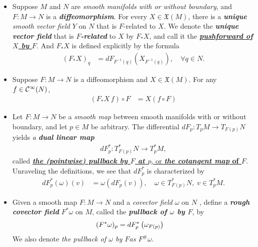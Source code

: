 \documentclass[11pt]{article}
\begin{document}
\begin{itemize}
\item \begin{definition}
Suppose $M$ and $N$ are \emph{smooth manifolds with or without boundary}, and $F: M \rightarrow N$ is a \textbf{\emph{diffeomorphism}}. For every $X \in \mathfrak{X}(M)$, there is a \textbf{\emph{unique}} \emph{smooth vector field} $Y$ on $N$ that is $F$-related to $X$. We denote the \emph{\textbf{unique vector field}} that is \emph{\textbf{$F$-related}} to $X$ by \underline{$F_{*}X$}, and call it the \underline{\emph{\textbf{pushforward of $X$ by $F$}}}. And $F_{*}X$ is defined explicitly by the formula
\begin{align}
(F_{*}X)_{q} &= dF_{F^{-1}(q)}(X_{F^{-1}(q)}),\quad \forall q\in N. \label{eqn: pushforward_of_vector_fields}
\end{align} 
\end{definition} 

\item \begin{corollary}
Suppose $F: M \rightarrow N$ is a diffeomorphism and $X \in \mathfrak{X}(M)$.  For any $f \in {\mathcal C}^{\infty}(N)$, 
\begin{align*}
(F_{*}X\,f) \circ F &= X(f \circ F)
\end{align*}
\end{corollary}

\item \begin{definition}
Let $F: M \rightarrow N$ be a \emph{smooth map} between smooth manifolds with or without boundary, and let $p \in M$ be arbitrary. The differential $dF_p: T_{p}M \rightarrow T_{F(p)}N$ yields \emph{a \textbf{dual linear map}}
\begin{align*}
dF_{p}^{*}:  T_{F(p)}^{*}N \rightarrow T_{p}^{*}M,
\end{align*} called \underline{\emph{\textbf{the (pointwise) pullback by $F$ at $p$}}, or \textbf{\emph{the cotangent map} of $F$}}. Unraveling
the definitions, we see that $dF_{p}^{*}$ is characterized by
\begin{align*}
dF_{p}^{*}(\omega)(v) &= \omega(dF_{p}(v)), \quad  \omega \in T_{F(p)}^{*}N, \; v \in T_{p}^{*}M.
\end{align*}
\end{definition}

\item \begin{definition}
Given a smooth map $F: M \rightarrow N$ and a \emph{covector field} $\omega$ on $N$ , define a \emph{\textbf{rough covector field}} $F^{*}\omega$ on $M$, called the
\textbf{\emph{pullback of $\omega$ by $F$}}, by
\begin{align}
(F^{*}\omega)_p &= dF_{p}^{*}\left(\omega_{F(p)}\right)  \label{eqn: pullback_of_covector_field}
\end{align}  We also denote \emph{the pullback of $\omega$ by $F$as $F^{\#}\omega$}.
\end{definition}


\end{itemize}
\end{document}
